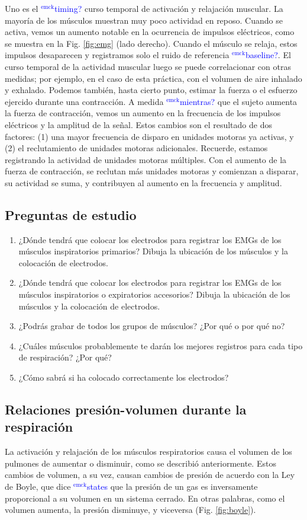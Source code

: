 \documentclass[12pt]{article}
\newcommand{\emck}[1]{\textcolor{blue}{$^{\textrm{emck}}${#1}}}
\begin{document}
Uno es el \emck{timing?} curso temporal de activación y relajación
muscular. La mayoría de los músculos muestran muy poco actividad en
reposo. Cuando se activa, vemos un aumento notable en la ocurrencia de
impulsos eléctricos, como se muestra en la Fig. \ref{fig:emg} (lado
derecho). Cuando el músculo se relaja, estos impulsos desaparecen y
registramos solo el ruido de referencia \emck{baseline?}. El curso
temporal de la actividad muscular luego se puede correlacionar con
otras medidas; por ejemplo, en el caso de esta práctica, con el
volumen de aire inhalado y exhalado. Podemos también, hasta cierto
punto, estimar la fuerza o el esfuerzo ejercido durante una
contracción. A medida \emck{mientras?} que el sujeto aumenta la fuerza
de contracción, vemos un aumento en la frecuencia de los impulsos
eléctricos y la amplitud de la señal. Estos cambios son el resultado
de dos factores: (1) una mayor frecuencia de disparo en unidades
motoras ya activas, y (2) el reclutamiento de unidades motoras
adicionales. Recuerde, estamos registrando la actividad de unidades
motoras múltiples. Con el aumento de la fuerza de contracción, se
reclutan más unidades motoras y comienzan a disparar, su actividad se
suma, y contribuyen al aumento en la frecuencia y amplitud.


\subsection*{Preguntas de estudio} 
\begin{enumerate}
\item ¿Dónde tendrá que colocar los electrodos para registrar los EMGs
  de los músculos inspiratorios primarios? Dibuja la ubicación de
  los músculos y la colocación de electrodos.
\item ¿Dónde tendrá que colocar los electrodos para registrar los EMGs
  de los músculos inspiratorios o expiratorios accesorios? Dibuja la
  ubicación de los músculos y la colocación de electrodos.
\item ¿Podrás grabar de todos los grupos de músculos? ¿Por qué o por qué no?
\item ¿Cuáles músculos probablemente te darán los mejores registros
  para cada tipo de respiración? ¿Por qué?
\item ¿Cómo sabrá si ha colocado correctamente los electrodos?
\end{enumerate}

\subsection*{Relaciones presión-volumen durante la respiración}
La activación y relajación de los músculos respiratorios causa el
volumen de los pulmones de aumentar o disminuir, como se describió
anteriormente. Estos cambios de volumen, a su vez, causan cambios de
presión de acuerdo con la Ley de Boyle, que dice \emck{states} que la
presión de un gas es inversamente proporcional a su volumen en un
sistema cerrado. En otras palabras, como el volumen aumenta, la
presión disminuye, y viceversa (Fig. \ref{fig:boyle}).
\end{document}
